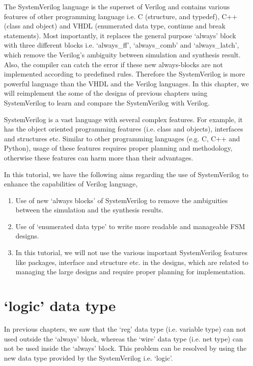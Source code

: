 The SystemVerilog language is the superset of Verilog and contains various features of other programming language i.e. C (structure, and typedef), C++ (class and object) and VHDL (enumerated data type, continue and break statements). Most importantly, it replaces the general purpose `always' block with three different blocks i.e. `always\_ff', `always\_comb' and `always\_latch', which remove the Verilog's ambiguity between simulation and synthesis result. Also, the compiler can catch the error if these new always-blocks are not implemented according to predefined rules. Therefore the SystemVerilog is more powerful language than the VHDL and the Verilog languages. In this chapter, we will reimplement the some of the designs of previous chapters using SystemVerilog to learn and compare the SystemVerilog with Verilog. 

\begin{noNumBox}
	SystemVerilog is a vast language with several complex features. For example, it has the object oriented programming features (i.e. class and objects), interfaces and structures etc. Similar to other programming languages (e.g. C, C++ and Python), usage of these features requires proper planning and methodology, otherwise these features can harm more than their advantages. 
	
	In this tutorial, we have the following aims regarding the use of SystemVerilog to enhance the capabilities of Verilog language, 
	\begin{enumerate}
		\item Use of new `always blocks' of SystemVerilog to remove the ambiguities between the simulation and the synthesis results. 
		\item Use of `enumerated data type' to write more readable and manageable FSM designs. 
		\item In this tutorial, we will not use the various important SystemVerilog features like packages, interface and structure etc. in the designs, which are related to managing the large designs and require proper planning for implementation. 
	\end{enumerate} 
\end{noNumBox}

\section{`logic' data type}
In previous chapters, we saw that the `reg' data type (i.e. variable type) can not used outside the `always' block, whereas the `wire' data type (i.e. net type) can not be used inside the `always' block. This problem can be resolved by using the new data type provided by the SystemVerilog i.e. `logic'. 


